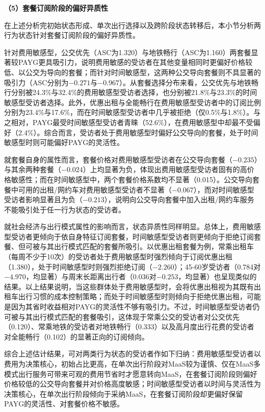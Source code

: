 \textbf{（5）套餐订阅阶段的偏好异质性}

在上述分析完初始状态形成、单次出行选择以及跨阶段状态转移后，本小节分析两行为状态针对套餐订阅阶段的偏好异质性。

针对费用敏感型，公交优先（ASC为1.320）与地铁畅行（ASC为1.160）两套餐显著较PAYG更具吸引力，说明费用敏感的受访者在其他变量相同时更偏好价格较低、以公交为导向的套餐；而针对时间敏感型，这两种公交导向套餐则不具显著的吸引力（ASC分别为$-0.271$与$-0.967$）。从套餐选择分布来看，公交优先与地铁畅行分别被24.3\%与32.4\%的费用敏感型受访者选择，也分别被21.8\%与23.3\%的时间敏感型受访者选择。此外，优惠出租与全能畅行在费用敏感型受访者中的订阅比例分别为23.4\%与17.6\%，而在时间敏感型受访者中几乎被拒绝（仅0.5\%与1.8\%）。与之相对，PAYG最受时间敏感型受访者青睐（52.6\%），在费用敏感型中却最不受偏好（2.4\%）。综合而言，受访者处于费用敏感型时偏好公交导向的套餐，处于时间敏感型时则可能偏好PAYG的灵活性。

就套餐自身的属性而言，套餐价格对费用敏感型受访者在公交导向套餐（$-0.235$）与其余两种套餐（$-0.024$）上均显著为负，体现出费用敏感型受访者固有的高价格敏感性；而在时间敏感型中，两个套餐价格系数均不显著（0.015）。公交导向套餐中可用的出租/网约车对费用敏感型受访者不显著（$-0.067$），而对时间敏感型受访者影响显著且为负（$-0.213$），说明向公交导向套餐中加入出租/网约车服务不能吸引处于任一行为状态的受访者。

就社会经济与出行模式属性的影响而言，状态异质性同样明显。总体上，费用敏感型受访者更倾向于依自身特征订阅套餐，时间敏感型受访者则更倾向于拒绝订阅套餐、但可被与其出行模式匹配的套餐所吸引。以优惠出租套餐为例，常乘出租车（每周不少于10次）的受访者处于费用敏感型时强烈倾向于订阅优惠出租（1.380），处于时间敏感型时则强烈拒绝订阅（$-2.260$）；45-60岁受访者（0.784对$-4.970$，均显著）与周末长距离出行者（0.036对$-0.253$，均显著）也呈现类似的结果。以上结果说明，当这些群体处于费用敏感型时，会将优惠出租视为其既有出租车出行习惯的成本控制策略；而处于时间敏感型时则倾向于拒绝优惠出租，可能是因为其省时收益相对PAYG的灵活性不够有吸引力。不过，时间敏感型受访者仍可被与其出行模式匹配的套餐吸引，这体现于常乘公交的受访者对公交优先（0.120）、常乘地铁的受访者对地铁畅行（0.333）以及高月度出行花费的受访者对全能畅行（0.102）的显著正向的订阅倾向。

综合上述估计结果，可对两类行为状态的受访者作如下归纳：费用敏感型受访者以费用为决策核心，初始占比更高，在单次出行阶段对MaaS较为谨慎、仅在MaaS多模式出行服务可带来可观的费用节省时才愿意转向MaaS，在套餐订阅阶段则偏好价格较低的公交导向套餐并对价格高度敏感；时间敏感型受访者以时间与灵活性为决策核心，在单次出行阶段倾向于采纳MaaS，在套餐订阅阶段却更偏好保留PAYG的灵活性、对套餐价格不敏感。

